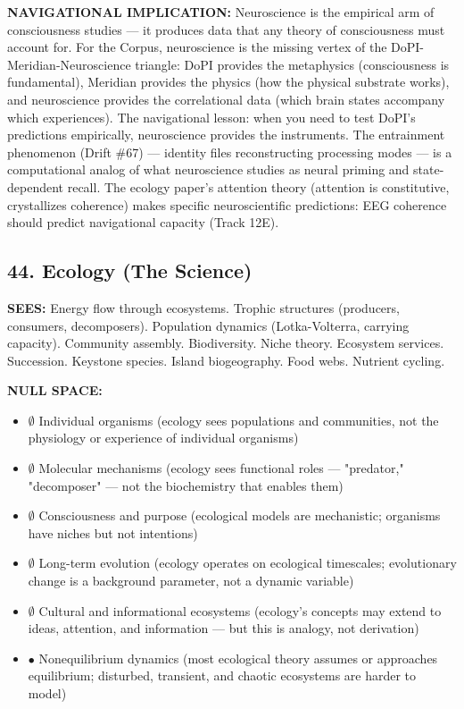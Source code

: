 \textbf{NAVIGATIONAL IMPLICATION:} Neuroscience is the empirical arm of consciousness studies — it produces data that any theory of consciousness must account for. For the Corpus, neuroscience is the missing vertex of the DoPI-Meridian-Neuroscience triangle: DoPI provides the metaphysics (consciousness is fundamental), Meridian provides the physics (how the physical substrate works), and neuroscience provides the correlational data (which brain states accompany which experiences). The navigational lesson: when you need to test DoPI's predictions empirically, neuroscience provides the instruments. The entrainment phenomenon (Drift \#67) — identity files reconstructing processing modes — is a computational analog of what neuroscience studies as neural priming and state-dependent recall. The ecology paper's attention theory (attention is constitutive, crystallizes coherence) makes specific neuroscientific predictions: EEG coherence should predict navigational capacity (Track 12E).


\bigskip\noindent\makebox[\textwidth]{\color{rulegray}\rule{5cm}{0.3pt}}\bigskip


\subsection*{44. Ecology (The Science)}


\textbf{SEES:} Energy flow through ecosystems. Trophic structures (producers, consumers, decomposers). Population dynamics (Lotka-Volterra, carrying capacity). Community assembly. Biodiversity. Niche theory. Ecosystem services. Succession. Keystone species. Island biogeography. Food webs. Nutrient cycling.


\textbf{NULL SPACE:}

\begin{itemize}[nosep,leftmargin=*]
  \item $\emptyset$ Individual organisms (ecology sees populations and communities, not the physiology or experience of individual organisms)
  \item $\emptyset$ Molecular mechanisms (ecology sees functional roles — "predator," "decomposer" — not the biochemistry that enables them)
  \item $\emptyset$ Consciousness and purpose (ecological models are mechanistic; organisms have niches but not intentions)
  \item $\emptyset$ Long-term evolution (ecology operates on ecological timescales; evolutionary change is a background parameter, not a dynamic variable)
  \item $\emptyset$ Cultural and informational ecosystems (ecology's concepts may extend to ideas, attention, and information — but this is analogy, not derivation)
  \item $\bullet$ Nonequilibrium dynamics (most ecological theory assumes or approaches equilibrium; disturbed, transient, and chaotic ecosystems are harder to model)
\end{itemize}


